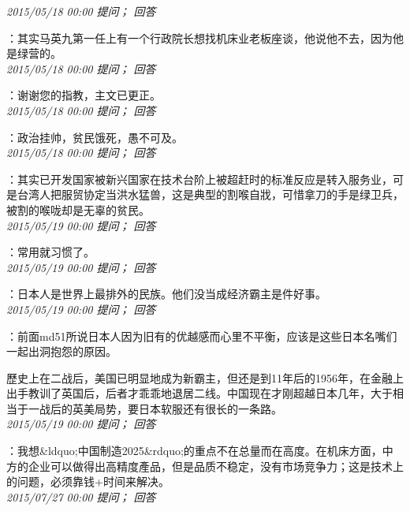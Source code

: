 \documentclass[twocolumn]{ctexart}
\begin{document}
\textit{\hfill\noindent\small 2015/05/18 00:00 提问； 回答}

：其实马英九第一任上有一个行政院长想找机床业老板座谈，他说他不去，因为他是绿营的。\\

\textit{\hfill\noindent\small 2015/05/18 00:00 提问； 回答}

：谢谢您的指教，主文已更正。\\

\textit{\hfill\noindent\small 2015/05/18 00:00 提问； 回答}

：政治挂帅，贫民饿死，愚不可及。\\

\textit{\hfill\noindent\small 2015/05/18 00:00 提问； 回答}

：其实已开发国家被新兴国家在技术台阶上被超赶时的标准反应是转入服务业，可是台湾人把服贸协定当洪水猛兽，这是典型的割喉自戕，可惜拿刀的手是绿卫兵，被割的喉咙却是无辜的贫民。\\

\textit{\hfill\noindent\small 2015/05/19 00:00 提问； 回答}

：常用就习惯了。\\

\textit{\hfill\noindent\small 2015/05/19 00:00 提问； 回答}

：日本人是世界上最排外的民族。他们没当成经济霸主是件好事。\\

\textit{\hfill\noindent\small 2015/05/19 00:00 提问； 回答}

：前面md51所说日本人因为旧有的优越感而心里不平衡，应该是这些日本名嘴们一起出洞抱怨的原因。

歷史上在二战后，美国已明显地成为新霸主，但还是到11年后的1956年，在金融上出手教训了英国后，后者才乖乖地退居二线。中国现在才刚超越日本几年，大于相当于一战后的英美局势，要日本软服还有很长的一条路。\\

\textit{\hfill\noindent\small 2015/05/19 00:00 提问； 回答}

：我想\&ldquo;中国制造2025\&rdquo;的重点不在总量而在高度。在机床方面，中方的企业可以做得出高精度產品，但是品质不稳定，没有市场竞争力；这是技术上的问题，必须靠钱+时间来解决。\\

\textit{\hfill\noindent\small 2015/07/27 00:00 提问； 回答}
\end{document}
